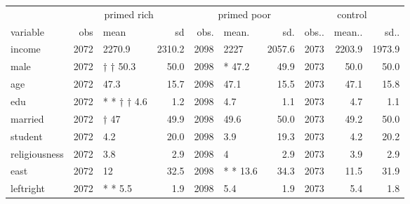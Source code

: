 \captionsetup[table]{labelformat=empty,skip=1pt}
\begin{longtable}{lrlrrlrrrr}
\toprule
 & \multicolumn{3}{c}{primed rich} & \multicolumn{3}{c}{primed poor} & \multicolumn{3}{c}{control} \\ 
 \cmidrule(lr){2-4} \cmidrule(lr){5-7} \cmidrule(lr){8-10}
variable & obs & mean & sd & obs. & mean. & sd. & obs.. & mean.. & sd.. \\ 
\midrule
income & 2072 &   2270.9 & 2310.2 & 2098 &  2227 & 2057.6 & 2073 & 2203.9 & 1973.9 \\ 
male & 2072 &   † † 50.3 & 50.0 & 2098 &  * 47.2 & 49.9 & 2073 & 50.0 & 50.0 \\ 
age & 2072 &   47.3 & 15.7 & 2098 &  47.1 & 15.5 & 2073 & 47.1 & 15.8 \\ 
edu & 2072 &  * *  † † 4.6 & 1.2 & 2098 &  4.7 & 1.1 & 2073 & 4.7 & 1.1 \\ 
married & 2072 &   † 47 & 49.9 & 2098 &  49.6 & 50.0 & 2073 & 49.2 & 50.0 \\ 
student & 2072 &   4.2 & 20.0 & 2098 &  3.9 & 19.3 & 2073 & 4.2 & 20.2 \\ 
religiousness & 2072 &   3.8 & 2.9 & 2098 &  4 & 2.9 & 2073 & 3.9 & 2.9 \\ 
east & 2072 &   12 & 32.5 & 2098 &  * * 13.6 & 34.3 & 2073 & 11.5 & 31.9 \\ 
leftright & 2072 &  * *  5.5 & 1.9 & 2098 &  5.4 & 1.9 & 2073 & 5.4 & 1.8 \\ 
 \bottomrule
\end{longtable}

